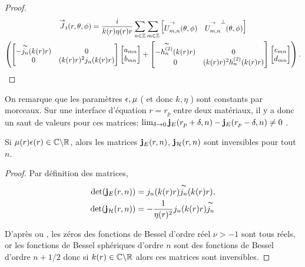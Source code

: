 \begin{proof}
\begin{multline*}
            {\overset{\rightarrow}{J}}_t(r,\theta,\phi) = \dfrac{i}{k(r)\eta(r)r}\sum_{n\in\mathbb Z}\sum_{m\in\mathbb Z}
            \begin{bmatrix}
                {\overset{\rightarrow}{U_{m,n}^{{}}}}(\theta,\phi) & {\overset{\rightarrow}{U_{m,n}^{{}}}}^\perp(\theta,\phi)
            \end{bmatrix}
            \\
            \left(
                \begin{bmatrix}
                    -\overset{\thicksim}{j_n}(k(r)r) & 0
                    \\
                    0 & (k(r)r)^2 j_n(k(r)r)
                \end{bmatrix}
                \begin{bmatrix}
                    a_{mn}
                    \\
                    b_{mn}
                \end{bmatrix}
                +
                \begin{bmatrix}
                    -\overset{\thicksim}{h^{(2)}_n}(k(r)r) & 0
                    \\                
                    0 & (k(r)r)^2 h^{(2)}_n(k(r)r)
                \end{bmatrix}
                \begin{bmatrix}
                    c_{mn}
                    \\
                    d_{mn}
                \end{bmatrix}
            \right).
        \end{multline*}
    \end{proof}

    On remarque que les paramètres \(\epsilon,\mu\) ( et donc \(k,\eta\) ) sont constants par morceaux.
    Sur une interface d'équation \(r=r_p\) entre deux matériaux, il y a donc un saut de valeurs pour ces matrices: \(\lim_{\delta\rightarrow 0 } \mathbf{j}_E(r_p+ \delta,n) - \mathbf{j}_E(r_p - \delta,n) \not = 0\) .

    \begin{prop}
      \label{lem:sphere:imp:inv_matrices_JE-HE}
      Si \(\mu(r)\epsilon(r) \in \mathbb C\backslash\mathbb R\), alors les matrices \(\mathbf{j}_E(r,n)\), \(\mathbf{j}_{\mathcal{H}}(r,n)\)  sont inversibles pour tout \(n\).
    \end{prop}

    \begin{proof}
      Par définition des matrices,
      \begin{align*}
        \det(\mathbf{j}_E(r,n)) &= j_n(k(r)r)\overset{\thicksim}{j_n}(k(r)r),
        \\
        \det(\mathbf{j}_{\mathcal{H}}(r,n)) &= -\dfrac{1}{\eta(r)^2}j_n(k(r)r)\overset{\thicksim}{j_n}
      \end{align*}

      D’après \cite[p.~370]{abramowitz_handbook_1964} ou \cite[\url{https://dlmf.nist.gov/10.58}]{dlmf_nist_2019}, les zéros des fonctions de Bessel d'ordre réel \(\nu >-1\) sont tous réels, or les fonctions de Bessel sphériques d'ordre \(n\) sont des fonctions de Bessel d'ordre \(n+1/2\) donc si \(k(r) \in\mathbb C\backslash\mathbb R\) alors ces matrices sont inversibles.
    \end{proof}


